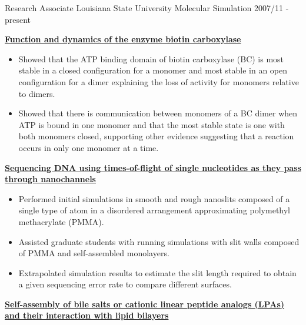 \pagebreak


\begin{cventries}
  \cventry
    {Research Associate} %
    {Louisiana State University} %
    {Molecular Simulation} %
    {2007/11 - present} %
    {
        \begin{cvitems} %
            \item {\textbf{\underline{Function and dynamics of the enzyme biotin carboxylase}}}
                \vspace{2pt}
                \begin{itemize}
                \item {Showed that the ATP binding domain of biotin carboxylase (BC) is most stable in a closed configuration for a monomer and most stable in an open configuration for a dimer explaining the loss of activity for monomers relative to dimers.}
                \item {Showed that there is communication between monomers of a BC dimer when ATP is bound in one monomer and that the most stable state is one with both monomers closed, supporting other evidence suggesting that a reaction occurs in only one monomer at a time.}
                \end{itemize}
            \item {\textbf{\underline{Sequencing DNA using times-of-flight of single nucleotides as they pass through nanochannels}}}
                \vspace{2pt}
                \begin{itemize}
                    \item {Performed initial simulations in smooth and rough nanoslits composed of a single type of atom in a disordered arrangement approximating polymethyl methacrylate (PMMA).}
                    \item {Assisted graduate students with running simulations with slit walls composed of PMMA and self-assembled monolayers.}
                    \item {Extrapolated simulation results to estimate the slit length required to obtain a given sequencing error rate to compare different surfaces.}
                \end{itemize}        
            \item {\textbf{\underline{Self-assembly of bile salts or cationic linear peptide analogs (LPAs) and their interaction with lipid bilayers}}}

\end{cvitems}}
\end{cventries}

